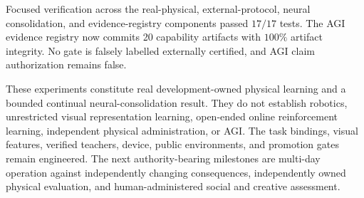 Focused verification across the real-physical, external-protocol, neural
consolidation, and evidence-registry components passed $17/17$ tests.  The AGI
evidence registry now commits 20 capability artifacts with $100\%$ artifact
integrity.  No gate is falsely labelled externally certified, and AGI claim
authorization remains false.

These experiments constitute real development-owned physical learning and a
bounded continual neural-consolidation result.  They do not establish robotics,
unrestricted visual representation learning, open-ended online reinforcement
learning, independent physical administration, or AGI.  The task bindings,
visual features, verified teachers, device, public environments, and promotion
gates remain engineered.  The next authority-bearing milestones are multi-day
operation against independently changing consequences, independently owned
physical evaluation, and human-administered social and creative assessment.
